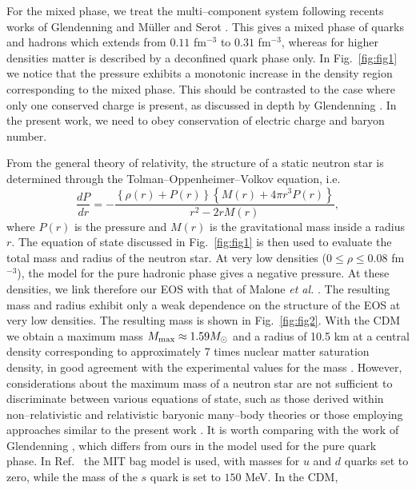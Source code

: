 For the mixed phase, we treat the 
multi--component system
following  recents works of 
Glendenning \cite{glen}
and M\"uller and Serot \cite{serot}. This gives a mixed phase of quarks
and hadrons 
which extends from $0.11$ fm$^{-3}$ to $0.31$ fm$^{-3}$, whereas for
higher densities matter is described by a deconfined quark phase only.
In Fig.\ \ref{fig:fig1} we notice that the pressure exhibits a
monotonic increase in the density region corresponding to the 
mixed phase. This should be contrasted to the case where only
one conserved charge is present, as discussed in depth by Glendenning
\cite{glen}. In the present work, we need to obey conservation
of electric charge and baryon number.  


From the general theory of relativity,
the structure of a static neutron star is determined through the
Tolman--Oppenheimer--Volkov equation, i.e.\
\begin{equation}
   \frac{dP}{dr}=
    - \frac{ \left\{\rho (r)+P(r) \right\}
   \left\{M(r)+4\pi r^3 P(r)\right\}}{r^2- 2r M(r)},
   \label{eq:tov}
\end{equation}
where $P(r)$ is the pressure and $M(r)$ is
the gravitational mass inside a radius $r$. The equation
of state discussed in Fig.\ \ref{fig:fig1} is then used
to evaluate the total mass and radius of the neutron star. At very low
densities ($0\leq \rho \leq 0.08$ fm$^{-3}$), the model
for the pure hadronic phase gives a negative pressure. At these
densities, we link therefore our EOS with that of Malone {\em et al.}
\cite{mjb75}. The resulting mass and radius exhibit only a weak dependence
on the structure of the EOS at very low densities.
The resulting mass           
is shown in Fig.\ \ref{fig:fig2}.
With the CDM we obtain a maximum mass
$M_{\rm{max}}\approx 1.59 M_{\odot}$
and a radius of 10.5 km at a central density
corresponding to approximately 7 times nuclear matter
saturation density, in good agreement with the experimental values
for the mass \cite{thorsett93,finn}. However, considerations about
the maximum mass of a neutron star are not sufficient to discriminate
between various equations of state, such as those derived
within non--relativistic and relativistic 
baryonic many--body theories \cite{behoo94,wff88}
or those employing approaches similar to the present work \cite{glen}.
It is worth comparing with the work of 
Glendenning \cite{glen}, which differs from ours in the 
model used for the pure quark phase. In Ref.\ \cite{glen} the MIT bag model
is used, with masses for $u$ and $d$ quarks set to zero, while
the mass of the $s$ quark is set to $150$ MeV. In the CDM,
